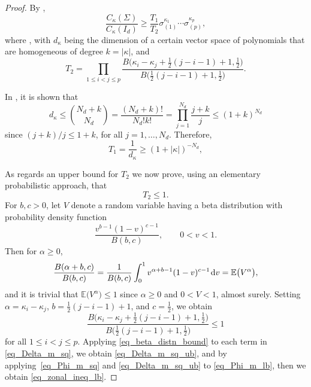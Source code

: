 \documentclass[pdftex]{sigma}
\numberwithin{equation}{section}
\def\E {\mathbb{E}}
\def\dd {\hskip1pt\mathrm{d}}
\begin{document}
\begin{proof}
By \cite[p.~241, line 4]{FarautKoranyi},
\begin{equation}
\label{eq_Phi_m_lb}
\frac{C_\kappa(\Sigma)}{C_\kappa(I_d)} \ge \frac{T_1}{T_2} \sigma_{(1)}^{\kappa_1} \cdots \sigma_{(p)}^{\kappa_p},
\end{equation}
where
,
with $d_\kappa$ being the dimension of a certain vector space of polynomials that are homogeneous of degree $k = |\kappa|$, and
\begin{equation}
\label{eq_Delta_m_sq}
T_2 = \prod_{1 \le i < j \le p} \frac{B\bigl(\kappa_i - \kappa_j + \frac12 (j-i-1)+1,\frac12\bigr)}{B\bigl(\frac12 (j-i-1)+1,\frac12\bigr)}.
\end{equation}

In \cite[p.~242, line 9]{FarautKoranyi}, it is shown that
\[
d_\kappa \le \binom{N_d+k}{N_d} = \frac{(N_d+k)!}{N_d! k!} = \prod_{j=1}^{N_d} \frac{j+k}{j} \le (1+k)^{N_d}
\]
since $(j+k)/j \le 1+k$, for all $j=1,\ldots,N_d$. Therefore, \begin{equation}
\label{eq_Phi_m_sq}
T_1 = \frac{1}{d_\kappa} \ge (1 + |\kappa|)^{-N_d},
\end{equation}

As regards an upper bound for $T_2$ we now prove, using an elementary probabilistic approach, that
\begin{equation}
\label{eq_Delta_m_sq_ub}
T_2 \le 1.
\end{equation}
For $b, c > 0$, let $V$ denote a random variable having a beta distribution with probability density function
\[
\frac{v^{b-1} (1-v)^{c-1}}{B(b,c)} ,\qquad 0 < v < 1.
\]
 Then for $\alpha \ge 0$,
\[
\frac{B(\alpha+b,c)}{B(b,c)} = \frac{1}{B(b,c)} \int_0^1 v^{\alpha+b-1} (1-v)^{c-1} \dd v = \E\bigl(V^\alpha\bigr),
\]
and it is trivial that $\E\bigl(V^\alpha\bigr) \le 1$ since $\alpha \ge 0$ and $0 < V < 1$, almost surely. Setting $\alpha = \kappa_i - \kappa_j$, $b = \tfrac12 (j-i-1)+1$, and $c = \tfrac12$, we obtain
\begin{equation}
\label{eq_beta_distn_bound}
\frac{B\bigl(\kappa_i - \kappa_j+\frac12 (j-i-1)+1,\frac12\bigr)}{B\bigl(\frac12 (j-i-1)+1,\frac12\bigr)} \le 1
\end{equation}
for all $1 \le i < j \le p$. Applying \eqref{eq_beta_distn_bound} to each term in \eqref{eq_Delta_m_sq}, we obtain \eqref{eq_Delta_m_sq_ub}, and by applying~\eqref{eq_Phi_m_sq} and \eqref{eq_Delta_m_sq_ub} to \eqref{eq_Phi_m_lb}, then we obtain \eqref{eq_zonal_ineq_lb}.
\end{proof}
\end{document}
